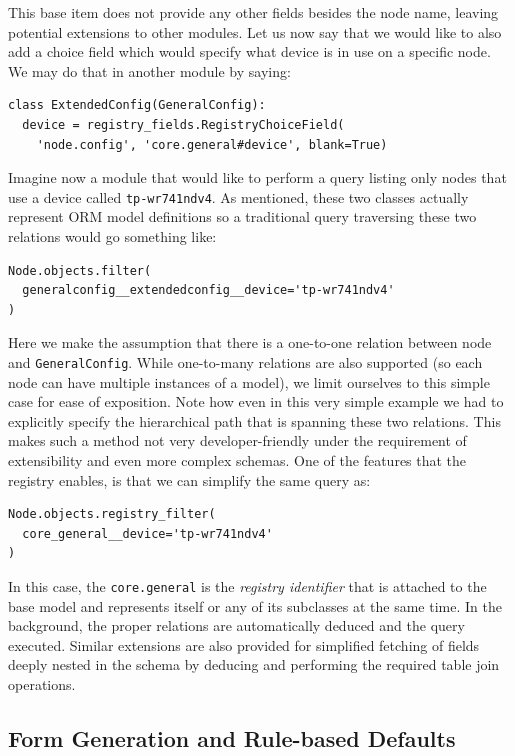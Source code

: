 \documentclass[5p,sort&compress]{elsarticle}
\begin{document}
This base item does not provide any other fields besides the node name, leaving potential extensions to other modules.
Let us now say that we would like to also add a choice field which would specify what device is in use on a specific node. We may do that in another module by saying:
\begin{verbatim}
class ExtendedConfig(GeneralConfig):
  device = registry_fields.RegistryChoiceField(
    'node.config', 'core.general#device', blank=True)
\end{verbatim}

Imagine now a module that would like to perform a query listing only nodes that use a device called \texttt{tp-wr741ndv4}.
As mentioned, these two classes actually represent ORM model definitions so a traditional query traversing these two relations would go something like:
\begin{verbatim}
Node.objects.filter(
  generalconfig__extendedconfig__device='tp-wr741ndv4'
)
\end{verbatim}

Here we make the assumption that there is a one-to-one relation between node and \texttt{GeneralConfig}.
While one-to-many relations are also supported (so each node can have multiple instances of a model), we limit ourselves to this simple case for ease of exposition.
Note how even in this very simple example we had to explicitly specify the hierarchical path that is spanning these two relations.
This makes such a method not very developer-friendly under the requirement of extensibility and even more complex schemas.
One of the features that the registry enables, is that we can simplify the same query as:
\begin{verbatim}
Node.objects.registry_filter(
  core_general__device='tp-wr741ndv4'
)
\end{verbatim}

In this case, the \texttt{core.general} is the \textit{registry identifier} that is attached to the base model and represents itself or any of its subclasses at the same time.
In the background, the proper relations are automatically deduced and the query executed.
Similar extensions are also provided for simplified fetching of fields deeply nested in the schema by deducing and performing the required table join operations.

\subsection{Form Generation and Rule-based Defaults}
\end{document}

